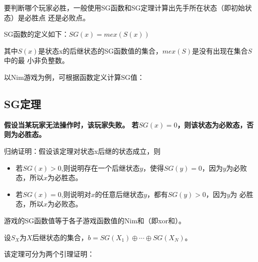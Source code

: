 要判断哪个玩家必胜，一般使用SG函数和SG定理计算出先手所在状态（即初始状态）是必胜点
还是必败点。

SG函数的定义如下：$SG(x)=mex(S(x))$

其中$S(x)$是状态x的后继状态的SG函数值的集合，$mex(S)$是没有出现在集合$S$中的最
小非负整数。

以Nim游戏为例，可根据函数定义计算SG值：



\subsection{SG定理}


\begin{theorem}
	\bfseries 假设当某玩家无法操作时，该玩家失败。\mdseries
	若$SG(x)=0$，则该状态为必败态，否则为必胜态。
\end{theorem}

归纳证明：假设该定理对状态x后继的状态成立，则

\begin{itemize}
	\item 若$SG(x)>0$,则说明存在一个后继状态$y$，使得$SG(y)=0$，因为$y$为必败
	      态，所以$x$为必胜态。
	\item 若$SG(x)=0$,则说明对$x$的任意后继状态$y$，都有$SG(y)>0$，因为$y$为
	      必胜态，所以$x$为必败态。
\end{itemize}

\begin{theorem}\label{SGB}
	游戏的SG函数值等于各子游戏函数值的Nim和（即xor和）。
\end{theorem}

设$S_X$为$X$后继状态的集合，$b=SG(X_1)\oplus \cdots \oplus SG(X_N)$。

该定理可分为两个引理证明：

